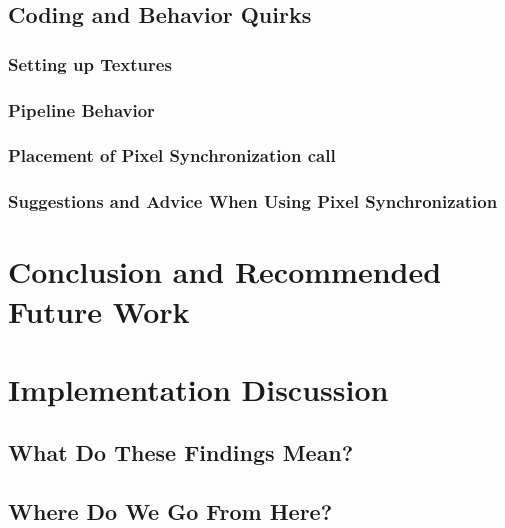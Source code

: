 \documentclass[a4paper, 12pt]{article}
\begin{document}
\subsection{Coding and Behavior Quirks}

\subsubsection{Setting up Textures}

\subsubsection{Pipeline Behavior}

\subsubsection{Placement of Pixel Synchronization call}

\lipsum[75-99]

\subsubsection{Suggestions and Advice When Using Pixel Synchronization}
\label{section:}

\lipsum[100-114]

\pagebreak

\section{Conclusion and Recommended Future Work}

\lipsum[115-119]

\section{Implementation Discussion}
\label{subsection:ImplementationDiscussion}

\lipsum[120-150]

\subsection{What Do These Findings Mean?}

\lipsum[1-19]

\subsection{Where Do We Go From Here?}

\lipsum[20-75]
\end{document}
